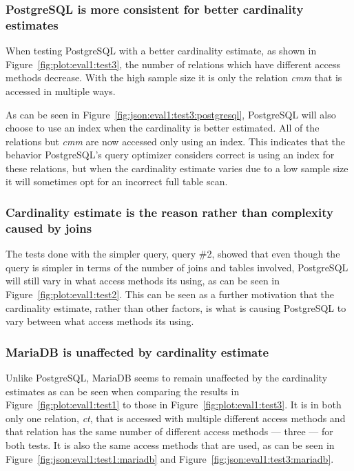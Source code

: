 \subsubsection{PostgreSQL is more consistent for better cardinality estimates}
When testing PostgreSQL with a better cardinality estimate, as shown in
Figure~\ref{fig:plot:eval1:test3}, the number of relations which have different
access methods decrease. With the high sample size it is only the relation
\textit{cmm} that is accessed in multiple ways.

As can be seen in Figure~\ref{fig:json:eval1:test3:postgresql}, PostgreSQL will also choose
to use an index when the cardinality is better estimated. All of the relations
but \textit{cmm} are now accessed only using an index. This indicates that the
behavior PostgreSQL's query optimizer considers correct is using an index for
these relations, but when the cardinality estimate varies due to a low sample
size it will sometimes opt for an incorrect full table scan.

\subsubsection{Cardinality estimate is the reason rather than complexity caused
  by joins}
The tests done with the simpler query, query \#2, showed that even though the
query is simpler in terms of the number of joins and tables involved, PostgreSQL
will still vary in what access methods its using, as can be seen in
Figure~\ref{fig:plot:eval1:test2}. This can be seen as a further motivation that
the cardinality estimate, rather than other factors, is what is causing
PostgreSQL to vary between what access methods its using.

\subsubsection{MariaDB is unaffected by cardinality estimate}
Unlike PostgreSQL, MariaDB seems to remain unaffected by the cardinality
estimates as can be seen when comparing the results in
Figure~\ref{fig:plot:eval1:test1} to those in Figure~\ref{fig:plot:eval1:test3}.
It is in both only one relation, \textit{ct}, that is accessed with multiple different
access methods and that relation has the same number of different access methods
--- three --- for both tests. It is also the same access methods that are used, as
can be seen in Figure~\ref{fig:json:eval1:test1:mariadb} and
Figure~\ref{fig:json:eval1:test3:mariadb}.

